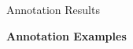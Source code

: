 \documentclass[final,14pt,t]{beamer}
\newcommand\includeneatgraphics[2][]{\addvbuffer[3pt 0pt]{\texttt{[image: \#2]}}}
\begin{document}
\begin{frame}{}
\begin{columns}[t]
\begin{column}{.33\linewidth}
\begin{minipage}[t][\textheight]{\linewidth}
\begin{block}{Annotation Results}
\begin{center}
\begin{minipage}{.85\textwidth}

\begin{center}
  \textbf{Annotation Examples}
\end{center}


\end{minipage}
\end{center}
\end{block}
\end{minipage}
\end{column}
\end{columns}
\end{frame}
\end{document}
